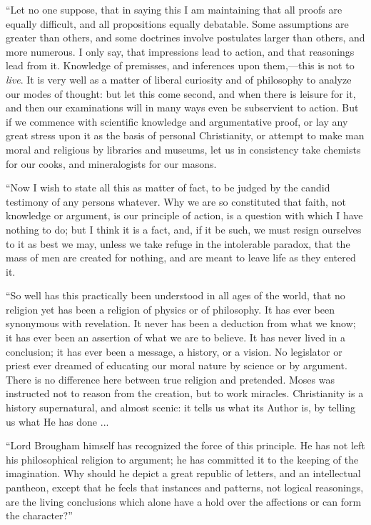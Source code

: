 ``Let no one suppose, that in saying this I am maintaining that
all proofs are equally difficult, and all propositions equally
debatable. Some assumptions are greater than others, and some
doctrines involve postulates larger than others, and more numerous. I
only say, that impressions lead to action, and that reasonings lead
from it. Knowledge of premisses, and inferences upon them,—this is
not to \emph{live}. It is very well as a matter of liberal curiosity
and of philosophy to analyze our modes of thought: but let this come
second, and when there is leisure for it, and then our examinations
will in many ways even be subservient to action. But if we commence
with scientific knowledge and argumentative proof, or lay any great
stress upon it as the basis of personal Christianity, or attempt to
make man moral and religious by libraries and museums, let us in
consistency take chemists for our cooks, and mineralogists for our
masons.

``Now I wish to state all this as matter of fact, to be judged
by the candid testimony of any persons whatever. Why we are so
constituted that faith, not knowledge or argument, is our principle of
action, is a question with which I have nothing to do; but I think it
is a fact, and, if it be such, we must resign ourselves to it as best
we may, unless we take refuge in the intolerable paradox, that the
mass of men are created for nothing, and are meant to leave life as
they entered it.

``So well has this practically been understood in all ages of
the world, that no religion yet has been a religion of physics or of
philosophy. It has ever been synonymous with revelation. It never has
been a deduction from what we know; it has ever been an assertion of
what we are to believe. It has never lived in a conclusion; it has
ever been a message, a history, or a vision. No legislator or priest
ever dreamed of educating our moral nature by science or by argument.
There is no difference here between true religion and pretended. Moses
was instructed not to reason from the creation, but to work miracles.
Christianity is a history supernatural, and almost scenic: it tells us
what its Author is, by telling us what He has done ...

``Lord Brougham himself has recognized the force of this
principle. He has not left his philosophical religion to argument; he
has committed it to the keeping of the imagination. Why should he
depict a great republic of letters, and an intellectual pantheon,
except that he feels that instances and patterns, not logical
reasonings, are the living conclusions which alone have a hold over
the affections or can form the character?''

